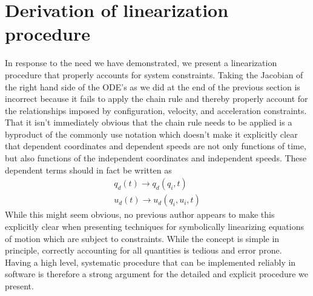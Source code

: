 \section{Derivation of linearization procedure}
\label{sec:derivations}
In response to the need we have demonstrated, we present a linearization
procedure that properly accounts for system constraints. Taking the Jacobian
of the right hand side of the ODE's as we did at the end of the previous
section is incorrect because it fails to apply the chain rule and thereby
properly account for the relationships imposed by configuration, velocity, and
acceleration constraints. That it isn't immediately obvious that the chain rule
needs to be applied is a byproduct of the commonly use notation which doesn't
make it explicitly clear that dependent coordinates and dependent speeds are not
only functions of time, but also functions of the independent coordinates and
independent speeds. These dependent terms should in fact be written as
\begin{align}
\label{eq:q_d_redefined}
{q}_d (t) \to {q}_d ({q}_i, t) \\
\label{eq:u_d_redefined}
{u}_d (t) \to {u}_d ({q}_i, {u}_i, t)
\end{align}
While this might seem obvious, no previous author appears to make this
explicitly clear when presenting techniques for symbolically linearizing
equations of motion which are subject to constraints. While the concept is
simple in principle, correctly accounting for all quantities is tedious and
error prone. Having a high level, systematic procedure that can be implemented
reliably in software is therefore a strong argument for the detailed and
explicit procedure we present.

